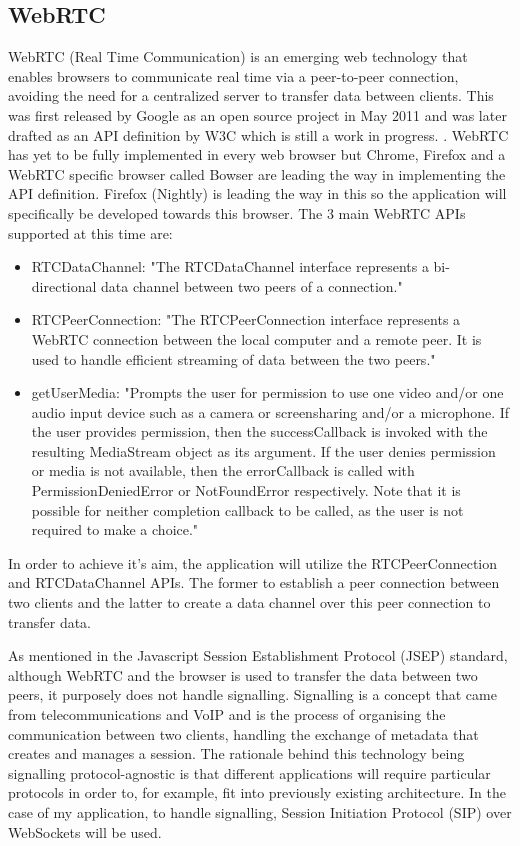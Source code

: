 \documentclass[]{report}
\begin{document}
			\subsection*{WebRTC}			
			WebRTC (Real Time Communication) is an emerging web technology that enables browsers to communicate real time via a peer-to-peer connection, avoiding the need for a centralized server to transfer data between clients. This was first released by Google as an open source project in May 2011 \cite{Google WebRTC Release} and was later drafted as an API definition by W3C which is still a work in progress. \cite{W3C WebRTC Definition}. WebRTC has yet to be fully implemented in every web browser but Chrome, Firefox and a WebRTC specific browser called Bowser are leading the way in implementing the API definition. Firefox (Nightly) is leading the way in this so the application will specifically be developed towards this browser\cite{WebRTC browser support}.
			The 3 main WebRTC APIs supported at this time are:
				\begin{itemize}
					\item RTCDataChannel:
					"The RTCDataChannel interface represents a bi-directional data channel between two peers of a connection." \cite{Mozilla Web API}
					\item RTCPeerConnection:
					"The RTCPeerConnection interface represents a WebRTC connection between the local computer and a remote peer. It is used to handle efficient streaming of data between the two peers." 
					\cite{Mozilla Web API}
					\item getUserMedia:
					"Prompts the user for permission to use one video and/or one audio input device such as a camera or screensharing and/or a microphone. If the user provides permission, then the successCallback is invoked with the resulting MediaStream object as its argument. If the user denies permission or media is not available, then the errorCallback is called with PermissionDeniedError or NotFoundError respectively. Note that it is possible for neither completion callback to be called, as the user is not required to make a choice."
					\cite{Mozilla Web API}
				\end{itemize}

			In order to achieve it's aim, the application will utilize the RTCPeerConnection and RTCDataChannel APIs. The former to establish a peer connection between two clients and the latter to create a data channel over this peer connection to transfer data.
					
			As mentioned in the Javascript Session Establishment Protocol (JSEP) standard\cite{JSEP}, although WebRTC and the browser is used to transfer the data between two peers, it purposely does not handle signalling. Signalling is a concept that came from telecommunications and VoIP and is the process of organising the communication between two clients, handling the exchange of metadata that creates and manages a session. The rationale behind this technology being signalling protocol-agnostic is that different applications will require particular protocols in order to, for example, fit into previously existing architecture. In the case of my application, to handle signalling, Session Initiation Protocol (SIP) over WebSockets will be used.
			
\end{document}
